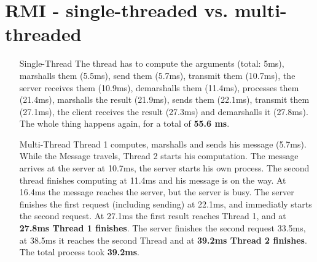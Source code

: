\documentclass{tudexercise}
\begin{document}
	\section{RMI - single-threaded vs. multi-threaded}
		\begin{itemize}
			\item[Single-Thread] The thread has to compute the arguments (total: 5ms), marshalls them (5.5ms), send them (5.7ms), transmit them (10.7ms), the server receives them (10.9ms), demarshalls them (11.4ms), processes them (21.4ms), marshalls the result (21.9ms), sends them (22.1ms), transmit them (27.1ms), the client receives the result (27.3ms) and demarshalls it (27.8ms). The whole thing happens again, for a total of \textbf{55.6 ms}.
			
			\item[Multi-Thread] Thread 1 computes, marshalls and sends his message (5.7ms). While the Message travels, Thread 2 starts his computation. The message arrives at the server at 10.7ms, the server starts his own process. The second thread finishes computing at 11.4ms and his message is on the way. At 16.4ms the message reaches the server, but the server is busy. The server finishes the first request (including sending) at 22.1ms, and immediatly starts the second request. At 27.1ms the first result reaches Thread 1, and at \textbf{27.8ms Thread 1 finishes}. The server finishes the second request 33.5ms, at 38.5ms it reaches the second Thread and at \textbf{39.2ms Thread 2 finishes}. The total process took \textbf{39.2ms}.
		\end{itemize}
\end{document}

